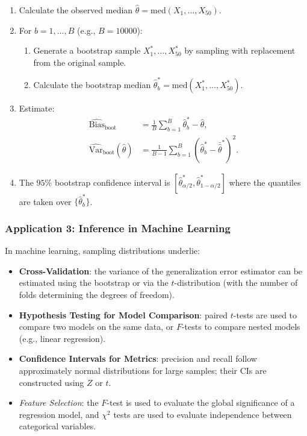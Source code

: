 \begin{solucion}
\begin{enumerate}
 \item Calculate the observed median $\hat{\theta} = \text{med}(X_1, \ldots, X_{50})$.
 \item For $b = 1, \ldots, B$ (e.g., $B = 10000$):
   \begin{enumerate}
    \item Generate a bootstrap sample $X_1^*, \ldots, X_{50}^*$ by sampling with replacement from the original sample.
    \item Calculate the bootstrap median $\hat{\theta}_b^* = \text{med}(X_1^*, \ldots, X_{50}^*)$.
   \end{enumerate}
 \item Estimate:
   \begin{align}
    \widehat{\text{Bias}}_{\text{boot}} &= \frac{1}{B}\sum_{b=1}^B \hat{\theta}_b^* - \hat{\theta}, \\
    \widehat{\text{Var}}_{\text{boot}}(\hat{\theta}) &= \frac{1}{B-1}\sum_{b=1}^B (\hat{\theta}_b^* - \bar{\hat{\theta}}^*)^2.
   \end{align}
 \item The $95\%$ bootstrap confidence interval is $[\hat{\theta}_{\alpha/2}^*, \hat{\theta}_{1-\alpha/2}^*]$ where the quantiles are taken over $\{\hat{\theta}_b^*\}$.
\end{enumerate}
\end{solucion}



\subsubsection{Application 3: Inference in Machine Learning}

In machine learning, sampling distributions underlie:

\begin{itemize}
 \item \textbf{Cross-Validation}: the variance of the generalization error estimator can be estimated using the bootstrap or via the $t$-distribution (with the number of folds determining the degrees of freedom).
 \item \textbf{Hypothesis Testing for Model Comparison}: paired $t$-tests are used to compare two models on the same data, or $F$-tests to compare nested models (e.g., linear regression).
 \item \textbf{Confidence Intervals for Metrics}: precision and recall follow approximately normal distributions for large samples; their CIs are constructed using $Z$ or $t$.
 \item \emph{Feature Selection}: the $F$-test is used to evaluate the global significance of a regression model, and $\chi^2$ tests are used to evaluate independence between categorical variables.
\end{itemize}

